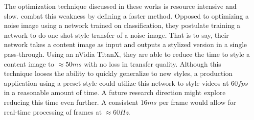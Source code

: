 \documentclass{article}
\begin{document}
The optimization technique discussed in these works is resource intensive
and slow. \cite{2016arXiv160308155J} combat this weakness by defining a faster
method. Opposed to optimizing a noise image using a network trained on
classification, they postulate training a network to do one-shot style
transfer of a noise image. That is to say, their network takes a content image
as input and outputs a stylized version in a single pass-through. Using an
nVidia TitanX, they are able to reduce the time to style a content image to
$\approx 50ms$ with no loss in transfer quality. Although this technique
looses the ability to quickly generalize to new styles, a production
application using a preset style could utilize this network to style videos at
$60fps$ in a reasonable amount of time. A future research direction might
explore reducing this time even further. A consistent $16ms$ per frame would
allow for real-time processing of frames at $\approx 60Hz$.


\clearpage





\end{document}

